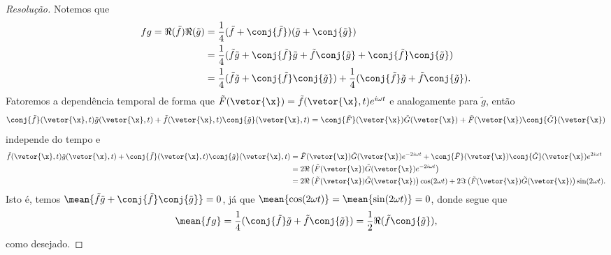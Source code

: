 \begin{proof}[Resolução]
    Notemos que
    \begin{align*}
        f g = \Re(\tilde{f})\Re(\tilde{g}) &= \frac14(\tilde{f} + \conj{\tilde{f}})(\tilde{g} + \conj{\tilde{g}})\\
                                           &= \frac14(\tilde{f} \tilde{g} + \conj{\tilde{f}}\tilde{g} + \tilde{f}\conj{\tilde{g}} + \conj{\tilde{f}}\conj{\tilde{g}})\\
                                           &= \frac14 ( \tilde{f} \tilde{g} + \conj{\tilde{f}}\conj{\tilde{g}}) + \frac14 (\conj{\tilde{f}}\tilde{g} + \tilde{f} \conj{\tilde{g}}).
    \end{align*}
    Fatoremos a dependência temporal de forma que \(\tilde{F}(\vetor{\x}) = \tilde{f}(\vetor{\x}, t)e^{i\omega t}\) e analogamente para \(\tilde{g}\), então
    \begin{equation*}
        \conj{\tilde{f}}(\vetor{\x}, t)\tilde{g}(\vetor{\x}, t) + \tilde{f}(\vetor{\x}, t) \conj{\tilde{g}}(\vetor{\x}, t) = \conj{\tilde{F}}(\vetor{\x}) \tilde{G}(\vetor{\x}) + \tilde{F}(\vetor{\x})\conj{\tilde{G}}(\vetor{\x})
    \end{equation*}
    independe do tempo e
    \begin{align*}
        \tilde{f}(\vetor{\x}, t) \tilde{g}(\vetor{\x}, t) + \conj{\tilde{f}}(\vetor{\x}, t)\conj{\tilde{g}}(\vetor{\x}, t)
        &= \tilde{F}(\vetor{\x}) \tilde{G}(\vetor{\x}) e^{-2i\omega t} + \conj{\tilde{F}}(\vetor{\x}) \conj{\tilde{G}}(\vetor{\x})e^{2i\omega t}\\
        &= 2\Re\left(\tilde{F}(\vetor{\x})\tilde{G}(\vetor{\x})e^{-2i\omega t}\right)\\
        &= 2\Re\left(\tilde{F}(\vetor{\x})\tilde{G}(\vetor{\x})\right)\cos(2\omega t) + 2\Im\left(\tilde{F}(\vetor{\x})\tilde{G}(\vetor{\x})\right)\sin(2\omega t).
    \end{align*}
    Isto é, temos \(\mean{\tilde{f} \tilde{g} + \conj{\tilde{f}}\conj{\tilde{g}}} = 0\), já que \(\mean{\cos(2\omega t)} = \mean{\sin(2\omega t)} = 0\), donde segue que
    \begin{equation*}
        \mean{f g} = \frac14 (\conj{\tilde{f}}\tilde{g} + \tilde{f}\conj{\tilde{g}}) = \frac12 \Re(\tilde{f}\conj{\tilde{g}}),
    \end{equation*}
    como desejado.
\end{proof}
